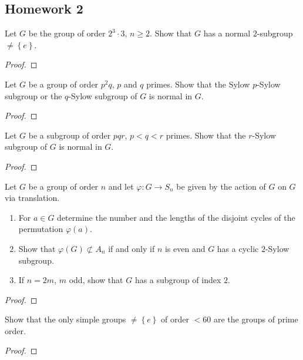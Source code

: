 \subsection{Homework 2}
\begin{problem}
  Let $G$ be the group of order $2^3\cdot 3$, $n\geq 2$. Show that $G$ has
  a normal $2$-subgroup $\neq\left\{e\right\}$.
\end{problem}
\begin{proof}
\end{proof}

\begin{problem}
  Let $G$ be a group of order $p^2q$, $p$ and $q$ primes. Show that the
  Sylow $p$-Sylow subgroup or the $q$-Sylow subgroup of $G$ is normal in
  $G$.
\end{problem}
\begin{proof}
\end{proof}

\begin{problem}
  Let $G$ be a subgroup of order $pqr$, $p<q<r$ primes. Show that the
  $r$-Sylow subgroup of $G$ is normal in $G$.
\end{problem}
\begin{proof}
\end{proof}

\begin{problem}
  Let $G$ be a group of order $n$ and let $\varphi\colon G\to S_n$ be given
  by the action of $G$ on $G$ via translation.
  \begin{enumerate}[label=(\alph*),noitemsep]
  \item For $a\in G$ determine the number and the lengths of the disjoint
    cycles of the permutation $\varphi(a)$.
  \item Show that $\varphi(G)\nsubset A_n$ if and only if $n$ is even and
    $G$ has a cyclic $2$-Sylow subgroup.
  \item If $n=2m$, $m$ odd, show that $G$ has a subgroup of index $2$.
  \end{enumerate}
\end{problem}
\begin{proof}
\end{proof}

\begin{problem}
  Show that the only simple groups $\neq\left\{e\right\}$ of order $<60$
  are the groups of prime order.
\end{problem}
\begin{proof}
\end{proof}

